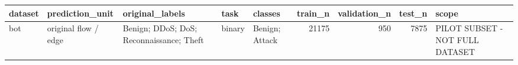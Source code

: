 \begin{tabular}{lllllrrrl}
\toprule
dataset & prediction\_unit & original\_labels & task & classes & train\_n & validation\_n & test\_n & scope \\
\midrule
bot & original flow / edge & Benign; DDoS; DoS; Reconnaissance; Theft & binary & Benign; Attack & 21175 & 950 & 7875 & PILOT SUBSET - NOT FULL DATASET \\
\bottomrule
\end{tabular}
